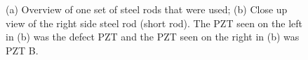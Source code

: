 \documentclass[11pt,letterpaper]{article}%
\begin{document}
%
\begin{figure}
\begin{subfigmatrix}{2}
\end{subfigmatrix}
%
   \caption[all]
   { \label{tr_setup_2}
(a) Overview of one set of steel rods that were used;
(b) Close up view of the right side steel rod (short rod).
The PZT seen on the left in (b) was the defect PZT and the PZT seen on the
right in (b) was PZT B.
 }
   \end{figure}
   
\end{document}
